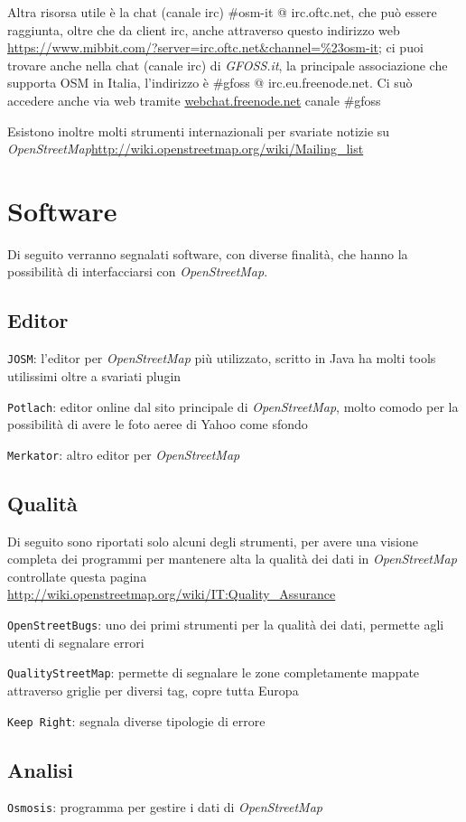 \documentclass[a4paper,twoside,12pt,]{article}
\newcommand{\osm}{\emph{OpenStreetMap}\xspace}
\newcommand{\soft}[1]{\texttt{#1}}
\newcommand{\pro}[1]{\emph{#1}}
\begin{document}
Altra risorsa utile è la chat (canale irc) \#osm-it @ irc.oftc.net, che può essere raggiunta, oltre che da client irc, anche attraverso questo indirizzo web \url{https://www.mibbit.com/?server=irc.oftc.net\&channel=\%23osm-it}; ci puoi trovare anche nella chat (canale irc) di \pro{GFOSS.it}, la principale associazione che supporta OSM in Italia, l'indirizzo è \#gfoss @ irc.eu.freenode.net. Ci suò accedere anche via web tramite \url{webchat.freenode.net}  canale \#gfoss

Esistono inoltre molti strumenti internazionali per svariate notizie su \osm \url{http://wiki.openstreetmap.org/wiki/Mailing_list}

\section{Software}
Di seguito verranno segnalati software, con diverse finalità, che hanno la possibilità di interfacciarsi con \osm.

\subsection{Editor}
\soft{JOSM}: l'editor per \osm più utilizzato, scritto in Java ha molti tools utilissimi oltre a svariati plugin

\soft{Potlach}: editor online dal sito principale di \osm, molto comodo per la possibilità di avere le foto aeree di Yahoo come sfondo

\soft{Merkator}: altro editor per \osm

\subsection{Qualità}
Di seguito sono riportati solo alcuni degli strumenti, per avere una visione completa dei programmi per mantenere alta la qualità dei dati in \osm controllate questa pagina \url{http://wiki.openstreetmap.org/wiki/IT:Quality_Assurance}

\soft{OpenStreetBugs}: uno dei primi strumenti per la qualità dei dati, permette agli utenti di segnalare errori

\soft{QualityStreetMap}: permette di segnalare le zone completamente mappate attraverso griglie per diversi tag, copre tutta Europa

\soft{Keep Right}: segnala diverse tipologie di errore

\subsection{Analisi}
\soft{Osmosis}: programma per gestire i dati di \osm
\end{document}
